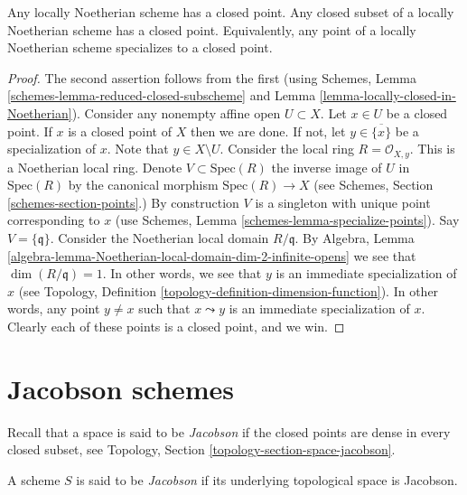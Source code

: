 \begin{lemma}
\label{lemma-locally-Noetherian-closed-point}
Any locally Noetherian scheme has a closed point.
Any closed subset of a locally Noetherian scheme has a closed point.
Equivalently, any point of a locally Noetherian scheme specializes
to a closed point.
\end{lemma}

\begin{proof}
The second assertion follows from the first (using
Schemes, Lemma \ref{schemes-lemma-reduced-closed-subscheme}
and Lemma \ref{lemma-locally-closed-in-Noetherian}).
Consider any nonempty affine open $U \subset X$.
Let $x \in U$ be a closed point. If $x$ is a closed point
of $X$ then we are done. If not, let $y \in \overline{\{x\}}$
be a specialization of $x$. Note that $y \in X \setminus U$.
Consider the local ring $R = \mathcal{O}_{X, y}$.
This is a Noetherian local ring. Denote $V \subset \text{Spec}(R)$
the inverse image of $U$ in $\text{Spec}(R)$ by the canonical morphism
$\text{Spec}(R) \to X$ (see Schemes, Section \ref{schemes-section-points}.)
By construction $V$ is a singleton with unique point
corresponding to $x$ (use
Schemes, Lemma \ref{schemes-lemma-specialize-points}).
Say $V = \{\mathfrak q\}$. Consider the Noetherian
local domain $R/\mathfrak q$. By
Algebra, Lemma \ref{algebra-lemma-Noetherian-local-domain-dim-2-infinite-opens}
we see that $\dim(R/\mathfrak q) = 1$.
In other words, we see that $y$ is an immediate specialization
of $x$ (see Topology, Definition \ref{topology-definition-dimension-function}).
In other words, any
point $y \not = x$ such that $x \leadsto y$ is an immediate
specialization of $x$. Clearly each of these points is a
closed point, and we win.
\end{proof}





\section{Jacobson schemes}
\label{section-jacobson}

\noindent
Recall that a space is said to be {\it Jacobson} if the closed points are
dense in every closed subset, see
Topology, Section \ref{topology-section-space-jacobson}.

\begin{definition}
\label{definition-jacobson}
A scheme $S$ is said to be {\it Jacobson} if its underlying topological
space is Jacobson.
\end{definition}

